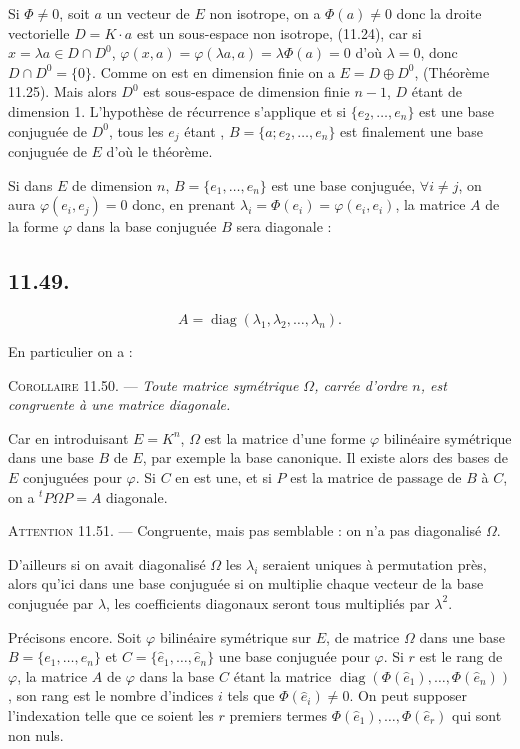 Si $\Phi\ne0$, soit $a$ un vecteur de $E$ non isotrope, on a $\Phi(a)\ne0$ donc la droite vectorielle $D=K\cdot a$ est un sous-espace non isotrope, (11.24), car si $x=\lambda a\in D\cap D^0$, $\varphi(x,a)=\varphi(\lambda a,a)=\lambda\Phi(a)=0$ d'où $\lambda=0$, donc $D\cap D^0=\{0\}$. Comme on est en dimension finie on a $E=D\oplus D^0$, (Théorème 11.25). Mais alors $D^0$ est sous-espace de dimension finie $n-1$, $D$ étant de dimension 1. L'hypothèse de récurrence s'applique et si $\{e_2,\ldots,e_n\}$ est une base conjuguée de $D^0$, tous les $e_j$ étant , $B=\{a;e_2,\ldots,e_n\}$ est finalement une base conjuguée de $E$ d'où le théorème. \bookend

Si dans $E$ de dimension $n$, $B=\{e_1,\ldots,e_n\}$ est une base conjuguée, $\forall i\ne j$, on aura $\varphi(e_i,e_j)=0$ donc, en prenant $\lambda_i=\Phi(e_i)=\varphi(e_i,e_i)$, la matrice $A$ de la forme $\varphi$ dans la base conjuguée $B$ sera diagonale :

\subsection*{11.49.}
\[
A=\operatorname{diag}(\lambda_1,\lambda_2,\ldots,\lambda_n).
\]

En particulier on a :

\medskip\noindent\textsc{Corollaire 11.50.} --- \emph{Toute matrice symétrique $\Omega$, carrée d'ordre $n$, est congruente à une matrice diagonale.}

Car en introduisant $E=K^n$, $\Omega$ est la matrice d'une forme $\varphi$ bilinéaire symétrique dans une base $B$ de $E$, par exemple la base canonique. Il existe alors des bases de $E$ conjuguées pour $\varphi$. Si $C$ en est une, et si $P$ est la matrice de passage de $B$ à $C$, on a ${}^tP\Omega P=A$ diagonale. \bookend

\medskip\noindent\textsc{Attention 11.51.} --- Congruente, mais pas semblable : on n'a pas diagonalisé $\Omega$.

D'ailleurs si on avait diagonalisé $\Omega$ les $\lambda_i$ seraient uniques à permutation près, alors qu'ici dans une base conjuguée si on multiplie chaque vecteur de la base conjuguée par $\lambda$, les coefficients diagonaux seront tous multipliés par $\lambda^2$.

Précisons encore. Soit $\varphi$ bilinéaire symétrique sur $E$, de matrice $\Omega$ dans une base $B=\{e_1,\ldots,e_n\}$ et $C=\{\hat e_1,\ldots,\hat e_n\}$ une base conjuguée pour $\varphi$. Si $r$ est le rang de $\varphi$, la matrice $A$ de $\varphi$ dans la base $C$ étant la matrice $\operatorname{diag}(\Phi(\hat e_1),\ldots,\Phi(\hat e_n))$, son rang est le nombre d'indices $i$ tels que $\Phi(\hat e_i)\ne0$. On peut supposer l'indexation telle que ce soient les $r$ premiers termes $\Phi(\hat e_1),\ldots,\Phi(\hat e_r)$ qui sont non nuls.

